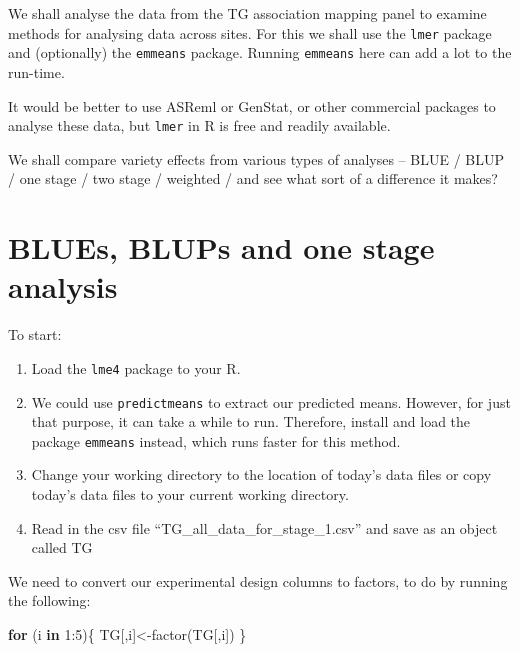 \documentclass[
]{book}
\newenvironment{Shaded}{\begin{snugshade}}{\end{snugshade}}
\newcommand{\ControlFlowTok}[1]{\textcolor[rgb]{0.13,0.29,0.53}{\textbf{#1}}}
\newcommand{\DecValTok}[1]{\textcolor[rgb]{0.00,0.00,0.81}{#1}}
\newcommand{\FunctionTok}[1]{\textcolor[rgb]{0.00,0.00,0.00}{#1}}
\newcommand{\NormalTok}[1]{#1}
\newcommand{\OtherTok}[1]{\textcolor[rgb]{0.56,0.35,0.01}{#1}}
\newcommand{\SpecialCharTok}[1]{\textcolor[rgb]{0.00,0.00,0.00}{#1}}
\begin{document}
We shall analyse the data from the TG association mapping panel to examine methods for analysing data across sites. For this we shall use the \texttt{lmer} package and (optionally) the \texttt{emmeans} package. Running \texttt{emmeans} here can add a lot to the run-time.

It would be better to use ASReml or GenStat, or other commercial packages to analyse these data, but \texttt{lmer} in R is free and readily available.

We shall compare variety effects from various types of analyses -- BLUE / BLUP / one stage / two stage / weighted / and see what sort of a difference it makes?

\hypertarget{blues-blups-and-one-stage-analysis}{%
\section{BLUEs, BLUPs and one stage analysis}\label{blues-blups-and-one-stage-analysis}}

To start:

\begin{enumerate}
\def\labelenumi{\arabic{enumi}.}
\item
  Load the \texttt{lme4} package to your R.
\item
  We could use \texttt{predictmeans} to extract our predicted means. However, for just that purpose, it can take a while to run. Therefore, install and load the package \texttt{emmeans} \citep{R-emmeans} instead, which runs faster for this method.
\item
  Change your working directory to the location of today's data files or copy today's data files to your current working directory.
\item
  Read in the csv file ``TG\_all\_data\_for\_stage\_1.csv'' and save as an object called TG
\end{enumerate}

We need to convert our experimental design columns to factors, to do by running the following:

\begin{Shaded}
\begin{Highlighting}[]
\ControlFlowTok{for}\NormalTok{ (i }\ControlFlowTok{in} \DecValTok{1}\SpecialCharTok{:}\DecValTok{5}\NormalTok{)\{}
\NormalTok{  TG[,i]}\OtherTok{\textless{}{-}}\FunctionTok{factor}\NormalTok{(TG[,i])}
\NormalTok{\}}
\end{Highlighting}
\end{Shaded}
\end{document}
